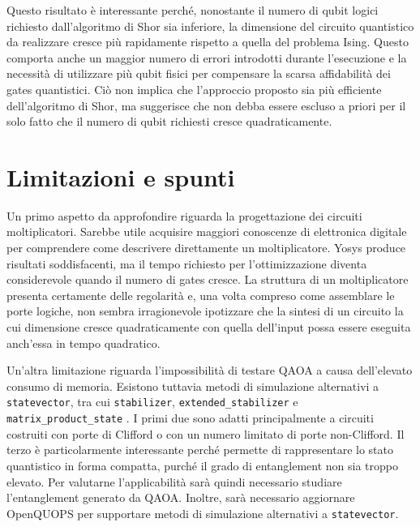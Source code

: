 \documentclass[]{article}
\begin{document}
	Questo risultato è interessante perché, nonostante il numero di qubit logici richiesto dall'algoritmo di Shor sia inferiore, la dimensione del circuito quantistico da realizzare cresce più rapidamente rispetto a quella del problema Ising. Questo comporta anche un maggior numero di errori introdotti durante l'esecuzione e la necessità di utilizzare più qubit fisici per compensare la scarsa affidabilità dei gates quantistici. Ciò non implica che l'approccio proposto sia più efficiente dell'algoritmo di Shor, ma suggerisce che non debba essere escluso a priori per il solo fatto che il numero di qubit richiesti cresce quadraticamente.
	
	\section{Limitazioni e spunti}
	\label{sec:limit}
	
	Un primo aspetto da approfondire riguarda la progettazione dei circuiti moltiplicatori. Sarebbe utile acquisire maggiori conoscenze di elettronica digitale per comprendere come descrivere direttamente un moltiplicatore. Yosys produce risultati soddisfacenti, ma il tempo richiesto per l'ottimizzazione diventa considerevole quando il numero di gates cresce. La struttura di un moltiplicatore presenta certamente delle regolarità e, una volta compreso come assemblare le porte logiche, non sembra irragionevole ipotizzare che la sintesi di un circuito la cui dimensione cresce quadraticamente con quella dell'input possa essere eseguita anch'essa in tempo quadratico.
	

	Un'altra limitazione riguarda l'impossibilità di testare QAOA a causa dell'elevato consumo di memoria. Esistono tuttavia metodi di simulazione alternativi a \texttt{statevector}, tra cui \texttt{stabilizer}, \texttt{extended\_stabilizer} e \texttt{matrix\_product\_state} \cite{qiskit_aer_aersimulator}. I primi due sono adatti principalmente a circuiti costruiti con porte di Clifford o con un numero limitato di porte non-Clifford. Il terzo è particolarmente interessante perché permette di rappresentare lo stato quantistico in forma compatta, purché il grado di entanglement non sia troppo elevato. Per valutarne l'applicabilità sarà quindi necessario studiare l'entanglement generato da QAOA. Inoltre, sarà necessario aggiornare OpenQUOPS per supportare metodi di simulazione alternativi a \texttt{statevector}.
\end{document}
